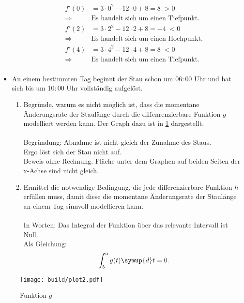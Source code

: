 \begin{itemize}
\begin{enumerate}
\begin{align*}
                 f'(0) &= 3\cdot 0^2 - 12\cdot 0 +8 = 8\;>0\\
                 \Rightarrow &\text{Es handelt sich um einen Tiefpunkt.}\\
                 f'(2) &= 3\cdot 2^2 - 12\cdot 2 +8 = -4\;<0\\
                 \Rightarrow &\text{Es handelt sich um einen Hochpunkt.}\\
                 f'(4) &= 3\cdot 4^2 - 12\cdot 4 +8 = 8\;<0\\
                 \Rightarrow &\text{Es handelt sich um einen Tiefpunkt.}\\
               \end{align*}
           \end{enumerate}
     \item An einem bestimmten Tag beginnt der Stau schon um 06$:$00 Uhr und hat sich bis um 10$:$00 Uhr vollständig aufgelöst.
         \begin{enumerate}
             \item Begründe, warum es nicht möglich ist, dass die momentane Änderungsrate der Staulänge durch die diffenrenzierbare Funktion $g$ modelliert werden kann.
                 Der Graph dazu ist in \ref{fig:g} dargestellt. \\\\
              Begründung: Abnahme ist nicht gleich der Zunahme des Staus.\\
              Ergo löst sich der Stau nicht auf.\\
              Beweis ohne Rechnung. Fläche unter dem Graphen auf beiden Seiten der x-Achse sind nicht gleich.
            \item Ermittel die notwendige Bedingung, die jede differenzierbare Funktion $h$ erfüllen muss, damit diese die momentane Änderungsrate der Staulänge an einem Tag sinnvoll modellieren kann.\\\\
              In Worten: Das Integral der Funktion über das relevante Intervall ist Null.\\
              Als Gleichung:
              \begin{align*}
                \int^{a}_{b}{g(t)\symup{d}t} = 0.
              \end{align*}
        \end{enumerate}
\end{itemize}
\begin{figure}
    \centering
    \texttt{[image: build/plot2.pdf]}
    \caption{Funktion $g$}
    \label{fig:g}
\end{figure}


